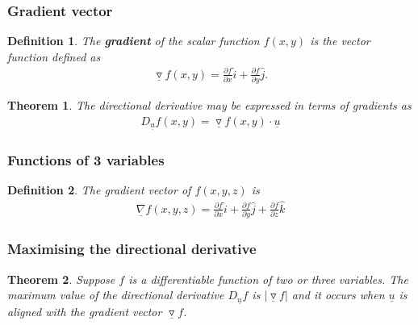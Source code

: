 \documentclass{article}
\theoremstyle{sltheorem}
\newtheorem{definition}{Definition}[section]
\newtheorem{theorem}{Theorem}[section]
\newcommand{\ih}{\widehat i}
\newcommand{\jh}{\widehat j}
\newcommand{\kh}{\widehat k}
\newcommand{\p}{\partial}
\newcommand{\grad}{\vec\triangledown}
\renewcommand{\vec}{\underline}
\newcommand*\B[1]{\textbf{#1}}
\begin{document}
\subsubsection{Gradient vector}
\begin{definition}
    The \B{gradient} of the scalar function $f(x,y)$ is the vector
    function defined as
    \begin{align*}
        \grad f(x,y)=\frac{\p f}{\p x}\ih + \frac{\p f}{\p y}\jh.
    \end{align*}
\end{definition}
\begin{theorem}
    The directional derivative may be expressed in terms of gradients
    as 
    \begin{align*}
        D_{\vec u}f(x,y)=\grad f(x,y)\cdot \vec u
    \end{align*}
\end{theorem}
\subsubsection{Functions of 3 variables}
\begin{definition}
    The gradient vector of $f(x,y,z)$ is
    \begin{align*}
        \vec\nabla f(x,y,z)=\frac{\p f}{\p x}\ih 
        + \frac{\p f}{\p y}\jh + \frac{\p f}{\p z}\kh
    \end{align*}
\end{definition}
\subsubsection{Maximising the directional derivative}
\begin{theorem}
    Suppose $f$ is a differentiable function of two or three variables.
    The maximum value of the directional derivative $D_{\vec u}f$ is
    $|\grad f|$ and it occurs when $\vec u$ is aligned with the gradient
    vector $\grad f$.
\end{theorem}
\end{document}
